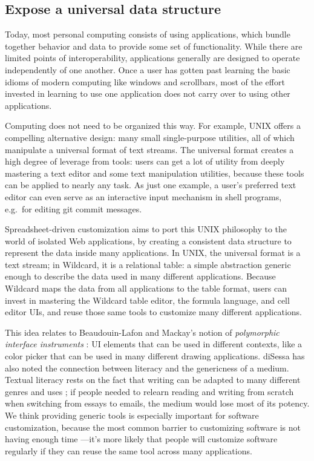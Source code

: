 \documentclass[english,submission]{programming}
\begin{document}
\hypertarget{expose-a-universal-data-structure}{%
\subsection{Expose a universal data
structure}\label{expose-a-universal-data-structure}}

Today, most personal computing consists of using applications, which
bundle together behavior and data to provide some set of functionality.
While there are limited points of interoperability, applications
generally are designed to operate independently of one another. Once a
user has gotten past learning the basic idioms of modern computing like
windows and scrollbars, most of the effort invested in learning to use
one application does not carry over to using other applications.

Computing does not need to be organized this way. For example, UNIX
offers a compelling alternative design: many small single-purpose
utilities, all of which manipulate a universal format of text streams.
The universal format creates a high degree of leverage from tools: users
can get a lot of utility from deeply mastering a text editor and some
text manipulation utilities, because these tools can be applied to
nearly any task. As just one example, a user's preferred text editor can
even serve as an interactive input mechanism in shell programs, e.g.~for
editing git commit messages.

Spreadsheet-driven customization aims to port this UNIX philosophy to
the world of isolated Web applications, by creating a consistent data
structure to represent the data inside many applications. In UNIX, the
universal format is a text stream; in Wildcard, it is a relational
table: a simple abstraction generic enough to describe the data used in
many different applications. Because Wildcard maps the data from all
applications to the table format, users can invest in mastering the
Wildcard table editor, the formula language, and cell editor UIs, and
reuse those same tools to customize many different applications.

This idea relates to Beaudouin-Lafon and Mackay's notion of
\emph{polymorphic interface instruments} \autocite{beaudouin-lafon2000}:
UI elements that can be used in different contexts, like a color picker
that can be used in many different drawing applications. diSessa has
also noted the connection between literacy and the genericness of a
medium. Textual literacy rests on the fact that writing can be adapted
to many different genres and uses \autocite{disessa2000}; if people
needed to relearn reading and writing from scratch when switching from
essays to emails, the medium would lose most of its potency. We think
providing generic tools is especially important for software
customization, because the most common barrier to customizing software
is not having enough time \autocite{mackay1991}---it's more likely that
people will customize software regularly if they can reuse the same tool
across many applications.
\end{document}
